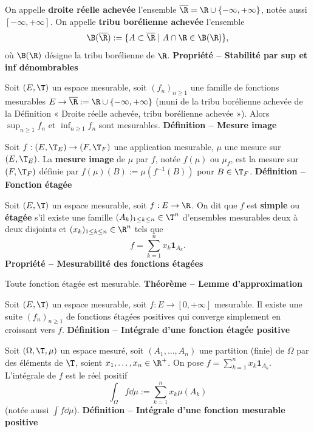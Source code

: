 On appelle \textbf{droite réelle achevée} l’ensemble $\overline\R=\R\cup\{-\infty,+\infty\}$, notée aussi $[-\infty,+\infty]$. On appelle \textbf{tribu borélienne achevée} l’ensemble
\[\B(\overline\R):=\{A\subset\overline\R\mid A\cap\R\in\B(\R)\},\]
où $\B(\R)$ désigne la tribu borélienne de $\R$.
\textbf{Propriété – Stabilité par sup et inf dénombrables}

Soit $(E,\T)$ un espace mesurable, soit $(f_n)_{n\ge1}$ une famille de fonctions mesurables $E\to\overline\R:=\R\cup\{-\infty,+\infty\}$ (muni de la tribu borélienne achevée de la Définition « Droite réelle achevée, tribu borélienne achevée »). Alors $\sup_{n\ge1}f_n$ et $\inf_{n\ge1}f_n$ sont mesurables.
\textbf{Définition – Mesure image}

Soit $f:(E,\T_E)\to(F,\T_F)$ une application mesurable, $\mu$ une mesure sur $(E,\T_E)$. La \textbf{mesure image} de $\mu$ par $f$, notée $f(\mu)$ ou $\mu_f$, est la mesure sur $(F,\T_F)$ définie par $f(\mu)(B):=\mu(f^{-1}(B))$ pour $B\in\T_F$.
\textbf{Définition – Fonction étagée}

Soit $(E,\T)$ un espace mesurable, soit $f:E\to\R$. On dit que $f$ est \textbf{simple} ou \textbf{étagée} s’il existe une famille $(A_k)_{1\le k\le n}\in\T^n$ d’ensembles mesurables deux à deux disjoints et $(x_k)_{1\le k\le n}\in\R^n$ tels que
\[f=\sum_{k=1}^n x_k\mathbf1_{A_k}.\]
\textbf{Propriété – Mesurabilité des fonctions étagées}

Toute fonction étagée est mesurable.
\textbf{Théorème – Lemme d’approximation}

Soit $(E,\T)$ un espace mesurable, soit $f:E\to[0,+\infty]$ mesurable. Il existe une suite $(f_n)_{n\ge1}$ de fonctions étagées positives qui converge simplement en croissant vers $f$.
\textbf{Définition – Intégrale d’une fonction étagée positive}

Soit $(\Omega,\T,\mu)$ un espace mesuré, soit $(A_1,\ldots,A_n)$ une partition (finie) de $\Omega$ par des éléments de $\T$, soient $x_1,\ldots,x_n\in\R^+$. On pose $f=\sum_{k=1}^n x_k\mathbf1_{A_k}$. L’intégrale de $f$ est le réel positif
\[\int_\Omega f\dd\mu:=\sum_{k=1}^n x_k\mu(A_k)\]
(notée aussi $\int f\dd\mu$).
\textbf{Définition – Intégrale d’une fonction mesurable positive}


